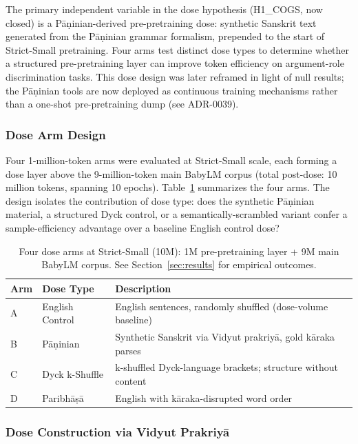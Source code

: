 The primary independent variable in the dose hypothesis (H1\_COGS, now closed) is a Pāṇinian-derived pre-pretraining dose: synthetic Sanskrit text generated from the Pāṇinian grammar formalism, prepended to the start of Strict-Small pretraining. Four arms test distinct dose types to determine whether a structured pre-pretraining layer can improve token efficiency on argument-role discrimination tasks. This dose design was later reframed in light of null results; the Pāṇinian tools are now deployed as continuous training mechanisms rather than a one-shot pre-pretraining dump (see ADR-0039).

\subsubsection{Dose Arm Design}

Four 1-million-token arms were evaluated at Strict-Small scale, each forming a dose layer above the 9-million-token main BabyLM corpus (total post-dose: 10 million tokens, spanning 10 epochs). Table~\ref{tab:dose_arms} summarizes the four arms. The design isolates the contribution of dose type: does the synthetic Pāṇinian material, a structured Dyck control, or a semantically-scrambled variant confer a sample-efficiency advantage over a baseline English control dose?

\begin{table}[h]
\centering
\small
\begin{tabular}{llp{5.5cm}}
\toprule
Arm & Dose Type & Description \\
\midrule
A & English Control & English sentences, randomly shuffled (dose-volume baseline) \\
B & Pāṇinian & Synthetic Sanskrit via Vidyut prakriyā, gold kāraka parses \\
C & Dyck k-Shuffle & k-shuffled Dyck-language brackets; structure without content \\
D & Paribhāṣā & English with kāraka-disrupted word order \\
\bottomrule
\end{tabular}
\caption{Four dose arms at Strict-Small (10M): 1M pre-pretraining layer + 9M main BabyLM corpus. See Section~\ref{sec:results} for empirical outcomes.}
\label{tab:dose_arms}
\end{table}

\subsubsection{Dose Construction via Vidyut Prakriyā}

